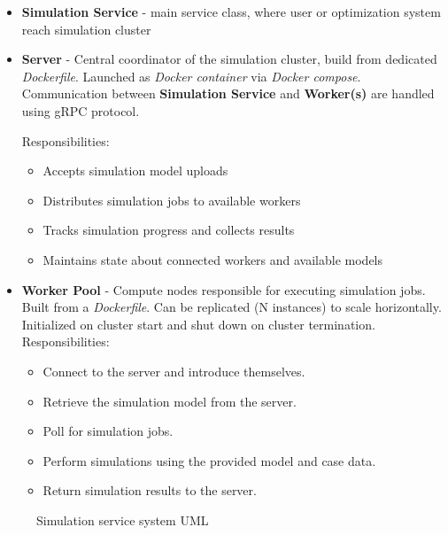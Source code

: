 \begin{itemize}
	\item \textbf{Simulation Service} - main service class, where user or optimization system reach simulation cluster

	\item \textbf{Server} - Central coordinator of the simulation cluster, build from dedicated \textit{Dockerfile}. Launched as \textit{Docker container} via \textit{Docker compose}. Communication between \textbf{Simulation Service} and \textbf{Worker(s)} are handled using gRPC protocol.

	Responsibilities:
	\begin{itemize}
		\item Accepts simulation model uploads
		\item Distributes simulation jobs to available workers
		\item Tracks simulation progress and collects results
		\item Maintains state about connected workers and available models
	\end{itemize}

	\item \textbf{Worker Pool} - Compute nodes responsible for executing simulation jobs. Built from a \textit{Dockerfile}. Can be replicated (N instances) to scale horizontally. Initialized on cluster start and shut down on cluster termination.
		Responsibilities:
	\begin{itemize}
		\item Connect to the server and introduce themselves.
		\item Retrieve the simulation model from the server.
		\item Poll for simulation jobs.
		\item Perform simulations using the provided model and case data.
		\item Return simulation results to the server.
	\end{itemize}

\end{itemize}

% 	

\begin{figure}[H]
	\centering
	
	\caption{Simulation service system UML}
	\label{fig:SimulationServiceUML}
\end{figure}

